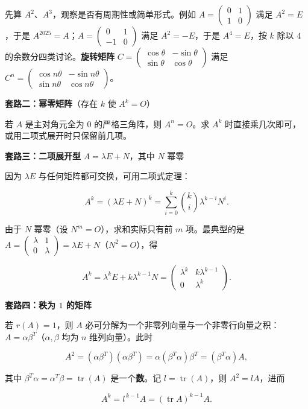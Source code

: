\documentclass[11pt,openany,UTF8]{ctexbook}
\begin{document}
先算 $A^2$、$A^3$，观察是否有周期性或简单形式。例如 $A=\begin{pmatrix}0&1\\1&0\end{pmatrix}$ 满足 $A^2=E$，于是 $A^{2025}=A$；$A=\begin{pmatrix}0&1\\-1&0\end{pmatrix}$ 满足 $A^2=-E$，于是 $A^4=E$，按 $k$ 除以 $4$ 的余数分四类讨论。\textbf{旋转矩阵} $C=\begin{pmatrix}\cos\theta&-\sin\theta\\\sin\theta&\cos\theta\end{pmatrix}$ 满足 $C^n=\begin{pmatrix}\cos n\theta&-\sin n\theta\\\sin n\theta&\cos n\theta\end{pmatrix}$。

\textbf{套路二：幂零矩阵}（存在 $k$ 使 $A^k=O$）

若 $A$ 是主对角元全为 $0$ 的严格三角阵，则 $A^n=O$。求 $A^k$ 时直接乘几次即可，或用二项式展开时只保留前几项。

\textbf{套路三：二项展开型} $A=\lambda E+N$，其中 $N$ 幂零

因为 $\lambda E$ 与任何矩阵都可交换，可用二项式定理：

\[A^k=(\lambda E+N)^k=\sum_{i=0}^{k}\binom{k}{i}\lambda^{k-i}N^i .\]

由于 $N$ 幂零（设 $N^m=O$），求和实际只有前 $m$ 项。最典型的是 $A=\begin{pmatrix}\lambda&1\\0&\lambda\end{pmatrix}=\lambda E+N$（$N^2=O$），得

\[A^k=\lambda^kE+k\lambda^{k-1}N=\begin{pmatrix}\lambda^k&k\lambda^{k-1}\\0&\lambda^k\end{pmatrix}.\]

\textbf{套路四：秩为 $1$ 的矩阵}

若 $r(A)=1$，则 $A$ 必可分解为一个非零列向量与一个非零行向量之积：$A=\alpha\beta^T$（$\alpha,\beta$ 均为 $n$ 维列向量）。此时

\[A^2=(\alpha\beta^T)(\alpha\beta^T)=\alpha(\beta^T\alpha)\beta^T=(\beta^T\alpha)A,\]

其中 $\beta^T\alpha=\alpha^T\beta=\operatorname{tr}(A)$ 是一个\textbf{数}。记 $l=\operatorname{tr}(A)$，则 $A^2=lA$，进而

\[A^k=l^{\,k-1}A=(\operatorname{tr}A)^{k-1}A .\]
\end{document}
